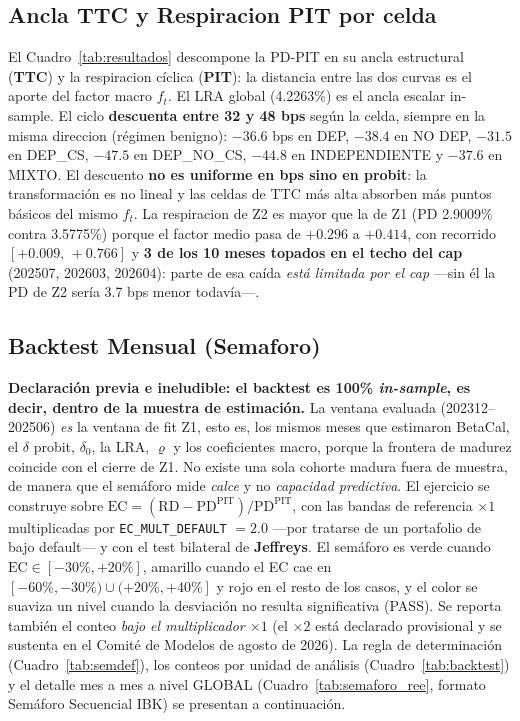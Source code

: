 \documentclass[12pt, a4paper]{article}
\newcommand{\PDPIT}{\ensuremath{\mathrm{PD}^{\mathrm{PIT}}}}
\newcommand{\RD}{\ensuremath{\mathrm{RD}}}
\renewcommand{\rho}{\ensuremath{\varrho}}
\newcommand{\ft}{\ensuremath{f_t}}
\newcommand{\EC}{\ensuremath{\mathrm{EC}}}
\begin{document}
\subsection{Ancla TTC y Respiracion PIT por celda}
El Cuadro~\ref{tab:resultados} descompone la PD-PIT en su ancla estructural
(\textbf{TTC}) y la respiracion cíclica (\textbf{PIT}): la distancia entre las dos curvas es el
aporte del factor macro $\ft$. El LRA global (4.2263\%) es el ancla escalar in-sample. El ciclo
\textbf{descuenta entre 32 y 48 bps} según la celda, siempre en la misma direccion (régimen
benigno): $-36.6$ bps en DEP, $-38.4$ en NO DEP, $-31.5$ en DEP\_CS, $-47.5$ en DEP\_NO\_CS,
$-44.8$ en INDEPENDIENTE y $-37.6$ en MIXTO. El descuento \textbf{no es uniforme en bps sino en
probit}: la transformación es no lineal y las celdas de TTC más alta absorben más puntos básicos del
mismo $\ft$. La respiracion de Z2 es mayor que la de Z1 (PD 2.9009\% contra 3.5775\%) porque el
factor medio pasa de $+0.296$ a $+0.414$, con recorrido $[+0.009,\,+0.766]$ y \textbf{3 de los 10
meses topados en el techo del cap} (202507, 202603, 202604): parte de esa caída \emph{está limitada
por el cap} ---sin él la PD de Z2 sería 3.7 bps menor todavía---.

\subsection{Backtest Mensual (Semaforo)}
\textbf{Declaración previa e ineludible: el backtest es 100\% \emph{in-sample}, es decir, dentro de
la muestra de estimación.} La ventana evaluada (202312--202506) \emph{es} la ventana de fit Z1,
esto es, los mismos meses que estimaron BetaCal, el $\delta$ probit, $\delta_0$, la LRA, $\rho$ y
los coeficientes macro, porque la frontera de madurez coincide con el cierre de Z1. No existe una
sola cohorte madura fuera de muestra, de manera que el semáforo mide \emph{calce} y no
\emph{capacidad predictiva}. El ejercicio se construye sobre $\EC=(\RD-\PDPIT)/\PDPIT$, con las
bandas de referencia $\times1$ multiplicadas por \texttt{EC\_MULT\_DEFAULT} $=2.0$ ---por tratarse
de un portafolio de bajo default--- y con el test bilateral de \textbf{Jeffreys}. El semáforo es
verde cuando $\EC\in[-30\%,+20\%]$, amarillo cuando el EC cae en
$[-60\%,-30\%)\cup(+20\%,+40\%]$ y rojo en el resto de los casos, y el color se suaviza un nivel
cuando la desviación no resulta significativa (PASS). Se reporta también el conteo \emph{bajo el multiplicador $\times1$} (el $\times2$ está declarado provisional y se sustenta en el Comité de Modelos de agosto de 2026). La
regla de determinación (Cuadro~\ref{tab:semdef}), los conteos por unidad de análisis
(Cuadro~\ref{tab:backtest}) y el detalle mes a mes a nivel GLOBAL (Cuadro~\ref{tab:semaforo_ree},
formato Semáforo Secuencial IBK) se presentan a continuación.
\end{document}
